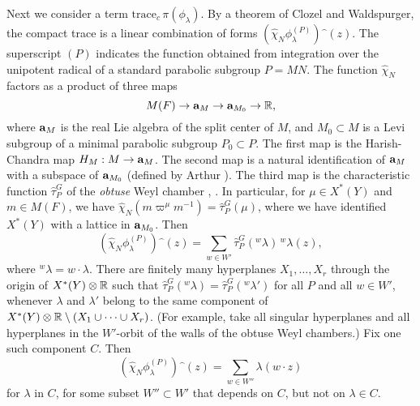 Next we consider a term $\text{trace}_c\,\pi(\phi_\lambda)$.
By a theorem of Clozel and Waldspurger, the compact trace
is a linear combination of forms 
$(\hat\chi_N\phi_\lambda^{(P)})\hat{\phantom o}(z)$.  
The superscript $(P)$ indicates the function obtained from 
integration over the unipotent radical of a standard parabolic
subgroup $P=MN$. 
The function $\hat\chi_N$ factors as a product of three
maps
$$M(F) \to \aa_M \to \aa_{M_0} \to {\Bbb R},$$
where $\aa_M$ is the real Lie algebra of the split center
of $M$, and $M_0\subset M$ is a Levi subgroup of 
a minimal parabolic subgroup $P_0\subset P$.
The first map 
is the Harish-Chandra map $H_M: M\to \aa_M$. The second
map is a natural
identification of $\aa_M$ with a subspace of
$\aa_{M_0}$ (defined by Arthur \cite{A1}).
The third map is
the characteristic function $\hat\tau_P^G$ of
the {\it obtuse\/} Weyl chamber \cite{A1,p.936}, \cite{Cl2,2.1}.
In particular, for $\mu\in X^*(Y)$ and $m\in M(F)$, we have
$\hat\chi_N(m \varpi^\mu m^{-1}) = \hat\tau_P^G(\mu)$,
where we have identified
$X^*(Y)$ with a lattice in $\aa_{M_0}$.
Then
$$(\hat\chi_N\phi_\lambda^{(P)})\hat{\phantom o} (z) = 
   \sum_{w\in W'} \hat\tau_P^G({}^w\!\lambda)\, {}^w\!\lambda(z),$$
where ${}^w\!\lambda = w\cdot\lambda$.
There are finitely many hyperplanes $X_1,\ldots,X_r$ through
the origin of $X^*(Y)\otimes {\Bbb R}$ such that
$\hat\tau_P^G({}^w\!\lambda) = \hat\tau_P^G({}^w\!\lambda')$
for all $P$ and all $w\in W'$, 
whenever $\lambda$ and $\lambda'$ belong
to the same component of $X^*(Y)\otimes {\Bbb R} \setminus
(X_1\cup\cdots\cup X_r)$.  (For example, take all
singular hyperplanes and all hyperplanes in the $W'$-orbit
of the walls of the obtuse Weyl chambers.)  Fix one
such component $C$.
Then 
$$(\hat\chi_N\phi_\lambda^{(P)})\hat{\phantom o}(z) = 
\sum_{w\in W''}\lambda(w\cdot z)$$ for $\lambda$ in $C$,
for some subset $W''\subset W'$ that depends on
$C$, but not on $\lambda\in C$.



